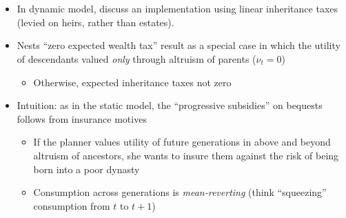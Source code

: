 \documentclass[11pt]{article}
\begin{document}
\section{\cite{farhi2010progressive}}
\begin{itemize}
    \item In dynamic model, \cite{farhi2010progressive} discuss an implementation using linear inheritance taxes (levied on heirs, rather than estates). 
    \item Nests \cite{kocherlakota2005zero} ``zero expected wealth tax'' result as a special case in which the utility of descendants valued \textit{only} through altruism of parents (\( \nu_t = 0 \))
    \begin{itemize}
        \item Otherwise, expected inheritance taxes not zero 
    \end{itemize}
    \item Intuition: as in the static model, the ``progressive subsidies'' on bequests follows from insurance motives 
    \begin{itemize}
        \item If the planner values utility of future generations in above and beyond altruism of ancestors, she wants to insure them against the risk of being born into a poor dynasty 
        \item Consumption across generations is \textit{mean-reverting} (think ``squeezing'' consumption from \( t \) to \( t+1 \))
    \end{itemize}
\end{itemize}



\end{document}
